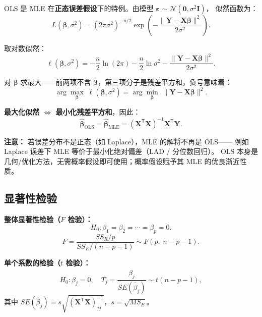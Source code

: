 \begin{remark}
OLS 是 MLE 在\textbf{正态误差假设}下的特例。由模型 $\bm{\varepsilon} \sim \mathcal{N}(\bm{0}, \sigma^2 \bm{I})$，
似然函数为：
\begin{equation}
    L(\bm{\beta}, \sigma^2) = (2\pi\sigma^2)^{-n/2}
    \exp\!\left(-\frac{\|\bm{Y} - \bm{X}\bm{\beta}\|^2}{2\sigma^2}\right).
\end{equation}

取对数似然：
\begin{equation}
    \ell(\bm{\beta}, \sigma^2) = -\frac{n}{2}\ln(2\pi) - \frac{n}{2}\ln\sigma^2
                                - \frac{\|\bm{Y} - \bm{X}\bm{\beta}\|^2}{2\sigma^2}.
\end{equation}

对 $\bm{\beta}$ 求最大——前两项不含 $\bm{\beta}$，第三项分子是残差平方和，负号意味着：
\begin{equation}
    \boxed{\arg\max_{\bm{\beta}} \;\ell(\bm{\beta}, \sigma^2)
           = \arg\min_{\bm{\beta}} \;\|\bm{Y} - \bm{X}\bm{\beta}\|^2}.
\end{equation}

\textbf{最大化似然 $\iff$ 最小化残差平方和}，因此：
\begin{equation}
    \boxed{\hat{\bm{\beta}}_{\text{OLS}} = \hat{\bm{\beta}}_{\text{MLE}} = (\bm{X}^{\mathsf{T}}\bm{X})^{-1}\bm{X}^{\mathsf{T}}\bm{Y}}.
\end{equation}

\textbf{注意：} 若误差分布不是正态（如 Laplace），MLE 的解将不再是 OLS——
例如 Laplace 误差下 MLE 等价于最小化绝对偏差（LAD / 分位数回归）。
OLS 本身是几何/优化方法，无需概率假设即可使用；概率假设赋予其 MLE 的优良渐近性质。
\end{remark}

\subsection{显著性检验}

\textbf{整体显著性检验（$F$ 检验）：}
\begin{equation}
    H_0: \beta_1 = \beta_2 = \cdots = \beta_p = 0.
\end{equation}
\begin{equation}
    F = \frac{SS_R / p}{SS_E / (n-p-1)} \sim F(p,\; n-p-1).
\end{equation}

\textbf{单个系数的检验（$t$ 检验）：}
\begin{equation}
    H_0: \beta_j = 0, \quad
    T_j = \frac{\hat{\beta}_j}{SE(\hat{\beta}_j)} \sim t(n-p-1),
\end{equation}
其中 $SE(\hat{\beta}_j) = s \sqrt{(\bm{X}^{\mathsf{T}}\bm{X})^{-1}_{jj}}$，$s = \sqrt{MS_E}$。


